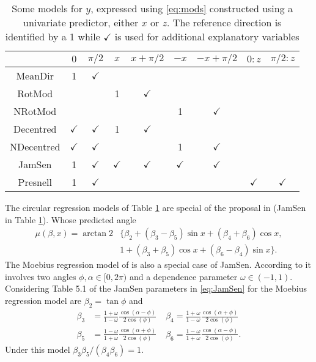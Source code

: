 \begin{table}%
\caption{Some models for $y$, expressed using \eqref{eq:mods} constructed using a univariate predictor, either  $x$ or  $z$.  The reference direction is identified by a 1 while $\checkmark$ is used for additional explanatory variables }
\label{tab:tab1}
\centering
\begin{tabular}{ccccccccc}
\hline
&$0$&$\pi/2$&$x$&$x+\pi/2$&$-x$&$-x+\pi/2$&$0:z$&$\pi/2:z$\\
\hline
MeanDir & 1 & $\checkmark$ & & & & & & \\
RotMod &  &  & 1& $\checkmark$ & & & & \\
NRotMod &  &   & & & 1& $\checkmark$ & & \\
Decentred & $\checkmark$ & $\checkmark$ &1 & $\checkmark$& & & &  \\
NDecentred & $\checkmark$ & $\checkmark$ & & &1 & $\checkmark$& &  \\
JamSen & 1 & $\checkmark$& $\checkmark$ & $\checkmark$&$\checkmark$ &$\checkmark$  & & \\
Presnell & 1 & $\checkmark$  &  & & & &$\checkmark$ &$\checkmark$ \\
\hline
\end{tabular}
\end{table}

The circular regression models of Table \ref{tab:tab1} are special of the proposal in \cite[chap. 8]{jammalamadaka2001topics} (JamSen in Table \ref{tab:tab1}).  Whose predicted angle
\begin{align}
\label{eq:JamSen}
\mu(\beta,x)=\arctan2 & \{\beta_2+(\beta_3-\beta_5) \sin x +(\beta_4+\beta_6) \cos x, \\
  & 1+ (\beta_3 + \beta_5) \cos x+(\beta_6-\beta_4) \sin x\}. \nonumber
\end{align}
The Moebius regression model of \cite{Downs02} is also a special case of JamSen.  According to \cite{polsen2015parametric}
it involves two angles $\phi, \alpha \in [0,2\pi)$ and a dependence parameter $\omega \in (-1,1)$. Considering Table 5.1 of \cite{polsen2015parametric} the JamSen parameters in \eqref{eq:JamSen} for the Moebius regression model are $\beta_2=\tan \phi$ and
\begin{align*}
\beta_3&=\frac{1+\omega}{1-\omega}\frac{\cos(\alpha-\phi)}{2\cos(\phi)} \;
&\beta_4=\frac{1+\omega}{1-\omega}\frac{\cos(\alpha+\phi)}{2\cos(\phi)} \\
\beta_5&=\frac{1-\omega}{1+\omega}\frac{\cos(\alpha+\phi)}{2\cos(\phi)} \;
&\beta_6=\frac{1-\omega}{1+\omega}\frac{\cos(\alpha-\phi)}{2\cos(\phi)}.
\end{align*}
Under this model $\beta_3\beta_5/(\beta_4\beta_6)=1$.

